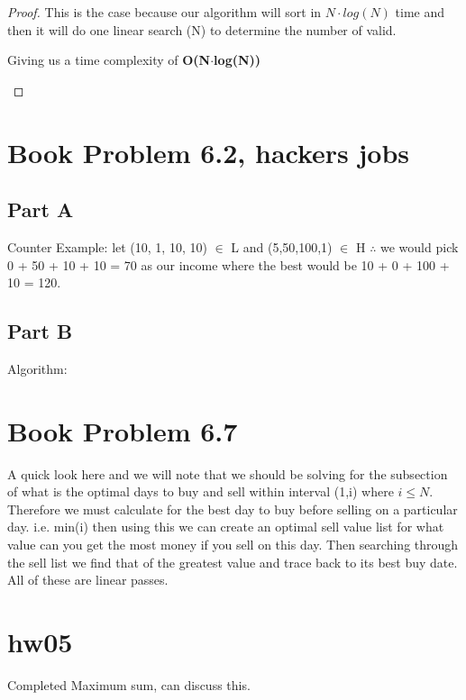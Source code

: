 \documentclass[12pt]{article}
\begin{document}
\begin{proof}
This is the case because our algorithm will sort in $N\cdot log(N)$ time and then
it will do one linear search (N) to determine the number of valid.
\begin{center}
    Giving us a time complexity of \textbf{O(N$\cdot$log(N))}
\end{center}
\end{proof}


\newpage

\section{Book Problem 6.2, hackers jobs}
\subsection{Part A}
Counter Example: let (10, 1, 10, 10) $\in$ L and (5,50,100,1) $\in$ H
$\therefore$ we would pick 0 + 50 + 10 + 10 = 70 as our income where
the best would be 10 + 0 + 100 + 10 = 120.
\subsection{Part B}
Algorithm:

\section{Book Problem 6.7}
A quick look here and we will note that we should be solving for the subsection of what is the optimal days
to buy and sell within interval (1,i) where $i \leq N$.  Therefore we must calculate for the best day to buy
before selling on a particular day.  i.e. min(i) then using this we can create an optimal sell value list for
what value can you get the most money if you sell on this day. Then searching through the sell list we find that
of the greatest value and trace back to its best buy date. All of these are linear passes.

\section{hw05}
Completed Maximum sum, can discuss this.

\end{document}
